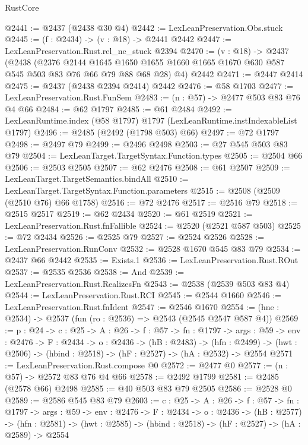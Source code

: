\begin{lexlean}{RustCore}
\begin{coremodule}
@2441 := @2437 (@2438 @30 @4)
@2442 := LexLeanPreservation.Obs.stuck
@2445 := (f : @2434) -> (v : @18) -> @2441 @2442
@2447 := LexLeanPreservation.Rust.rel_ne_stuck @2394
@2470 := (v : @18) ->
  @2437
    (@2438
      (@2376
        @2144
        @1645
        @1650
        @1655
        @1660
        @1665
        @1670
        @630
        @587
        @545
        @503
        @83
        @76
        @66
        @79
        @88
        @68
        @28)
      @4)
    @2442
@2471 := @2447 @2414
@2475 := @2437 (@2438 @2394 @2414) @2442
@2476 := @58 @1703
@2477 := LexLeanPreservation.Rust.FunSem
@2483 := (n : @57) -> @2477 @503 @83 @76 @4 @66
@2484 := @62 @1797
@2485 := @61 @2484
@2492 := LexLeanRuntime.index (@58 @1797) @1797 (LexLeanRuntime.instIndexableList @1797)
@2496 := @2485 (@2492 (@1798 @503) @66)
@2497 := @72 @1797
@2498 := @2497 @79
@2499 := @2496 @2498
@2503 := @27 @545 @503 @83 @79
@2504 := LexLeanTarget.TargetSyntax.Function.types
@2505 := @2504 @66
@2506 := @2503 @2505
@2507 := @62 @2476
@2508 := @61 @2507
@2509 := LexLeanTarget.TargetSemantics.bindAll
@2510 := LexLeanTarget.TargetSyntax.Function.parameters
@2515 := @2508 (@2509 (@2510 @76) @66 @1758)
@2516 := @72 @2476
@2517 := @2516 @79
@2518 := @2515 @2517
@2519 := @62 @2434
@2520 := @61 @2519
@2521 := LexLeanPreservation.Rust.fnFallible
@2524 := @2520 (@2521 @587 @503)
@2525 := @72 @2434
@2526 := @2525 @79
@2527 := @2524 @2526
@2528 := LexLeanPreservation.RunConv
@2532 := @2528 @1670 @545 @83 @79
@2534 := @2437 @66 @2442
@2535 := Exists.{1}
@2536 := LexLeanPreservation.Rust.ROut
@2537 := @2535 @2536
@2538 := And
@2539 := LexLeanPreservation.Rust.RealizesFn
@2543 := @2538 (@2539 @503 @83 @4)
@2544 := LexLeanPreservation.Rust.RCI
@2545 := @2544 @1660
@2546 := LexLeanPreservation.Rust.fnIdent
@2547 := @2546 @1670
@2554 := (hne : @2534) -> @2537 (fun (ro : @2536) => @2543 (@2545 @2547 @587 @4))
@2569 := {p : @24} ->
  {c : @25} ->
  {A : @26} ->
  {f : @57} ->
  {fn : @1797} ->
  {args : @59} ->
  {env : @2476} ->
  {F : @2434} ->
  {o : @2436} ->
  (hB : @2483) ->
  (hfn : @2499) -> (hwt : @2506) -> (hbind : @2518) -> (hF : @2527) -> (hA : @2532) -> @2554
@2571 := LexLeanPreservation.Rust.compose @0
@2572 := @2477 @0
@2577 := (n : @57) -> @2572 @83 @76 @4 @66
@2578 := @2492 @1799
@2581 := @2485 (@2578 @66) @2498
@2585 := @40 @503 @83 @79 @2505
@2586 := @2528 @0
@2589 := @2586 @545 @83 @79
@2603 := {c : @25} ->
  {A : @26} ->
  {f : @57} ->
  {fn : @1797} ->
  {args : @59} ->
  {env : @2476} ->
  {F : @2434} ->
  {o : @2436} ->
  (hB : @2577) ->
  (hfn : @2581) -> (hwt : @2585) -> (hbind : @2518) -> (hF : @2527) -> (hA : @2589) -> @2554

\end{coremodule}
\end{lexlean}

